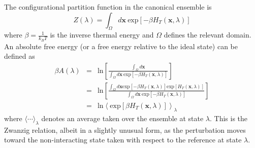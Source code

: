 \documentclass[%
 preprint,
 amsmath,amssymb,
 aps,
]{revtex4-1}
\renewcommand{\vec}[1]{{\mathbf{#1}}}
\begin{document}
The configurational partition function in the canonical ensemble is
\begin{equation}
Z(\lambda) = \int_{\Omega} d\vec{x} \: \mbox{exp} \left[  - \beta H_T (\vec{x},\lambda) \right]
\end{equation} 
where $\beta = \frac{1}{k_BT}$ is the inverse thermal energy and $\Omega$ defines the relevant domain.  An absolute free energy (or a free energy relative to the ideal state) can be defined as
\begin{eqnarray}
\beta A (\lambda) & = & \mbox{ln} \left[ \frac{\int_{\Omega} d\vec{x}}
{ \int_{\Omega} d\vec{x} \: \mbox{exp} \left[  - \beta H_T (\vec{x},\lambda) \right]}  \right] \\
& = &
\mbox{ln} \left[ \frac{\int_{\Omega} d\vec{x}  \mbox{exp} \left[  - \beta H_T (\vec{x},\lambda) \right] 
 \mbox{exp} \left[  H_T (\vec{x},\lambda) \right]}
{ \int_{\Omega} d\vec{x} \: \mbox{exp} \left[  -\beta H_T (\vec{x},\lambda) \right]}  \right] \\
& = & \mbox{ln} \left \langle  \mbox{exp} \left[ \beta H_T (\vec{x},\lambda) \right]
\right \rangle_{\lambda}
\label{e:Zwanzig}
\end{eqnarray}
where $\langle \cdots \rangle_{\lambda}$ denotes an average taken over the ensemble at state $\lambda$.  This is the
Zwanzig relation, albeit in a slightly unusual form, as the perturbation moves toward the non-interacting state 
taken with respect to the reference at state $\lambda$. 
\end{document}
